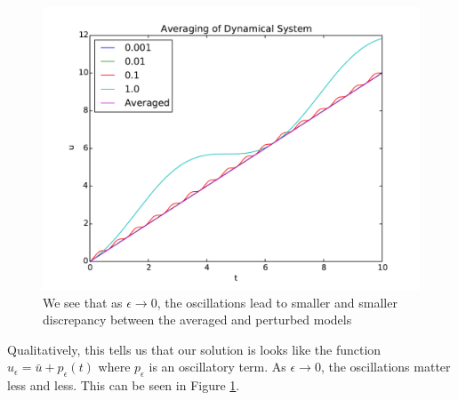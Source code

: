 \begin{figure}
    \centering
    \includegraphics[width=\textwidth]{images/averaging.pdf}
    \caption{We see that as $\epsilon \to 0$, the oscillations lead to smaller and smaller discrepancy between the averaged and perturbed models}
    \label{fig:avgdynill}
\end{figure}

Qualitatively, this tells us that our solution is looks like the function $u_{\epsilon} = \bar{u} + p_{\epsilon}(t)$ where $p_{\epsilon}$ is an oscillatory term. As $\epsilon \to 0$, the oscillations matter less and less. This can be seen in Figure \ref{fig:avgdynill}. 

